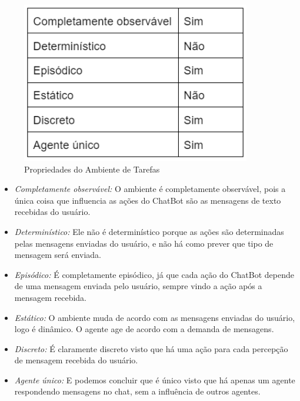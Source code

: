 \begin{figure}[H]
   \begin{center}
      \includegraphics[width=10cm]{img/propri.png}
      \caption{Propriedades do Ambiente de Tarefas} \label{propri}
   \end{center}
\end{figure}

\begin{itemize}
   \item \textit{Completamente observável:} O ambiente é completamente observável, pois a única coisa que influencia as ações do ChatBot são as mensagens de texto recebidas do usuário.

   \item \textit{Determinístico:} Ele não é determinístico porque as ações são determinadas pelas mensagens enviadas do usuário, e não há como prever que tipo de mensagem será enviada.

   \item \textit{Episódico:} É completamente episódico, já que cada ação do ChatBot depende de uma mensagem enviada pelo usuário, sempre vindo a ação após a mensagem recebida.

   \item \textit{Estático:} O ambiente muda de acordo com as mensagens enviadas do usuário, logo é dinâmico. O agente age de acordo com a demanda de mensagens.

   \item \textit{Discreto:} É claramente discreto visto que há uma ação para cada percepção de mensagem recebida do usuário.

   \item \textit{Agente único:} E podemos concluir que é único visto que há apenas um agente respondendo mensagens no chat, sem a influência de outros agentes.


\end{itemize}

